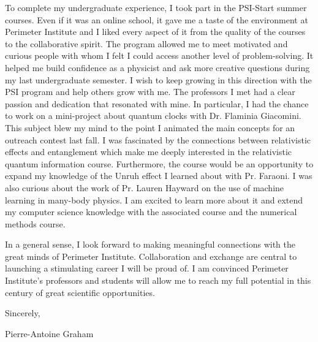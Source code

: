 \documentclass[12pt]{article}
\begin{document}
To complete my undergraduate experience, I took part in the PSI-Start summer courses. Even if it was an online school, it gave me a taste of the environment at Perimeter Institute and I liked every aspect of it from the quality of the courses to the collaborative spirit. The program allowed me to meet motivated and curious people with whom I felt I could access another level of problem-solving. It helped me build confidence as a physicist and ask more creative questions during my last undergraduate semester. I wish to keep growing in this direction with the PSI program and help others grow with me. The professors I met had a clear passion and dedication that resonated with mine. In particular, I had the chance to work on a mini-project about quantum clocks with Dr. Flaminia Giacomini. This subject blew my mind to the point I animated the main concepts for an outreach contest last fall. I was fascinated by the connections between relativistic effects and entanglement which make me deeply interested in the relativistic quantum information course. Furthermore, the course would be an opportunity to expand my knowledge of the Unruh effect I learned about with Pr. Faraoni. I was also curious about the work of Pr. Lauren Hayward on the use of machine learning in many-body physics. I am excited to learn more about it and extend my computer science knowledge with the associated course and the numerical methods course.  \vspace{0.3cm}   

In a general sense, I look forward to making meaningful connections with the great minds of Perimeter Institute. Collaboration and exchange are central to launching a stimulating career I will be proud of. I am convinced Perimeter Institute's professors and students will allow me to reach my full potential in this century of great scientific opportunities.
\vspace{0.3cm}

Sincerely,

\vspace{0.4cm}
Pierre-Antoine Graham
\end{document}

